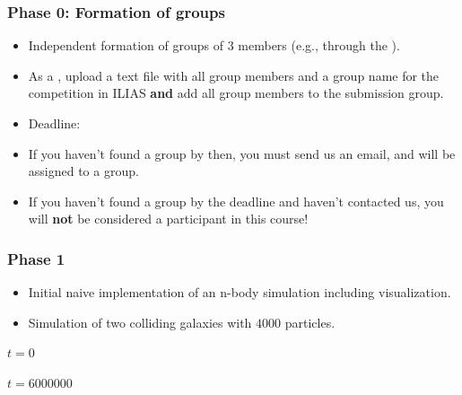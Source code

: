 \begin{frame}[fragile]
  \frametitle{Phase 0: Formation of groups}
  \begin{itemize}
      \item Independent formation of groups of 3 members (e.g., through the ).
      \item As a , upload a text file with all group members and a group name for the competition in ILIAS \textbf{and} add all group members to the submission group.
      \item Deadline: \textbf{\dateDeadlinePhaseZero}
      \item If you haven't found a group by then, you must send us an email, and will be assigned to a group.
      \item If you haven't found a group by the deadline and haven't contacted us, you will \textbf{not} be considered a participant in this course!
  \end{itemize}
\end{frame}

\begin{frame}[fragile, c]
  \frametitle{Phase 1}
  \begin{itemize}
      \item Initial naive implementation of an n-body simulation including visualization.
      \item Simulation of two colliding galaxies with $\num{4000}$ particles.
  \end{itemize}
  \vspace*{-0.5em}
  \begin{figure}
      \centering
      \hspace{1em}
      \DisplayRightArrow
      \hspace{1em}
  \end{figure}
  \vspace*{-.5em}
  \begin{minipage}{.47\textwidth}
    \centering
    $t = \num{0}$
  \end{minipage}
  \hfill
  \begin{minipage}{.47\textwidth}
    \centering
    $t = \num{6000000}$
  \end{minipage}
\end{frame}

